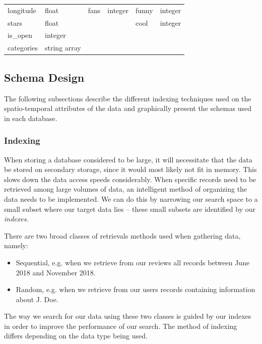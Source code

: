 \begin{table}[h]
\begin{tabular}{ |p{2cm}|p{2cm}||p{2cm}|p{2cm}||p{2cm}|p{2cm}|}
        longitude                       & float                       &  fans           & integer      & funny        & integer   \\
        stars                           & float                       &                 &              & cool         & integer   \\
        is\_open                        & integer                     &                 &              &              &           \\
        categories                      & string array                &                 &              &              &           \\
        \hline
    \end{tabular}
    \label{tab:yelp-data}
\end{table}

\subsection{Schema Design}

The following subsections describe the different indexing techniques used on the spatio-temporal attributes of the data and graphically present the schemas used in each database.

\subsubsection{Indexing}
When storing a database considered to be large, it will necessitate that the data be stored on secondary storage, since it would most likely not fit in memory. This slows down the data access speeds considerably. When specific records need to be retrieved among large volumes of data, an intelligent method of organizing the data needs to be implemented. We can do this by narrowing our search space to a small subset where our target data lies -- these small subsets are identified by our \emph{indexes}.

There are two broad classes \cite{btree} of retrievals methods used when gathering data, namely:
\begin{itemize}
    \item Sequential, e.g. when we retrieve from our reviews all records between June 2018 and November 2018.
    \item Random, e.g. when we retrieve from our users records containing information about J. Doe.
\end{itemize}
The way we search for our data using these two classes is guided by our indexes in order to improve the performance of our search. The method of indexing differs depending on the data type being used.

